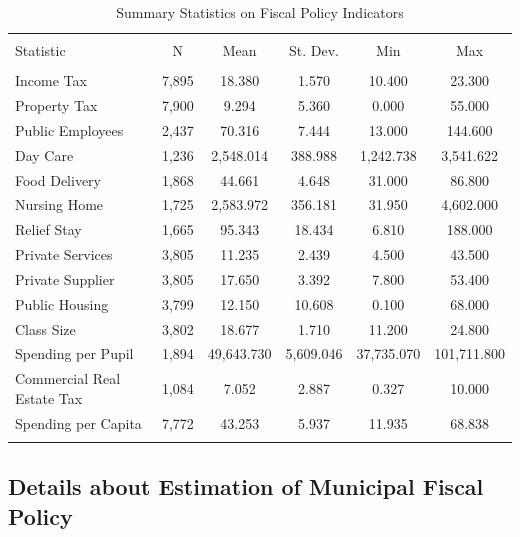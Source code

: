 \documentclass[a4paper,12pt]{article}
\begin{document}
\begin{table}[!htbp] \centering 
	\caption{Summary Statistics on Fiscal Policy Indicators} 
	\label{tab:SumInd} 
	\begin{tabular}{@{\extracolsep{5pt}}lccccc} 
		\\[-1.8ex]\hline 
		\hline \\[-1.8ex] 
		Statistic & \multicolumn{1}{c}{N} & \multicolumn{1}{c}{Mean} & \multicolumn{1}{c}{St. Dev.} & \multicolumn{1}{c}{Min} & \multicolumn{1}{c}{Max} \\ 
		\hline \\[-1.8ex] 
		Income Tax & 7,895 & 18.380 & 1.570 & 10.400 & 23.300 \\ 
		Property Tax & 7,900 & 9.294 & 5.360 & 0.000 & 55.000 \\ 
		Public Employees & 2,437 & 70.316 & 7.444 & 13.000 & 144.600 \\ 
		Day Care & 1,236 & 2,548.014 & 388.988 & 1,242.738 & 3,541.622 \\ 
		Food Delivery & 1,868 & 44.661 & 4.648 & 31.000 & 86.800 \\ 
		Nursing Home & 1,725 & 2,583.972 & 356.181 & 31.950 & 4,602.000 \\ 
		Relief Stay & 1,665 & 95.343 & 18.434 & 6.810 & 188.000 \\ 
		Private Services & 3,805 & 11.235 & 2.439 & 4.500 & 43.500 \\ 
		Private Supplier & 3,805 & 17.650 & 3.392 & 7.800 & 53.400 \\ 
		Public Housing & 3,799 & 12.150 & 10.608 & 0.100 & 68.000 \\ 
		Class Size & 3,802 & 18.677 & 1.710 & 11.200 & 24.800 \\ 
		Spending per Pupil & 1,894 & 49,643.730 & 5,609.046 & 37,735.070 & 101,711.800 \\ 
		Commercial Real Estate Tax & 1,084 & 7.052 & 2.887 & 0.327 & 10.000 \\ 
		Spending per Capita & 7,772 & 43.253 & 5.937 & 11.935 & 68.838 \\ 
		\hline \\[-1.8ex] 
	\end{tabular} 
\end{table} 


\clearpage

\subsection{Details about Estimation of Municipal Fiscal Policy} \label{estimation}
\end{document}
